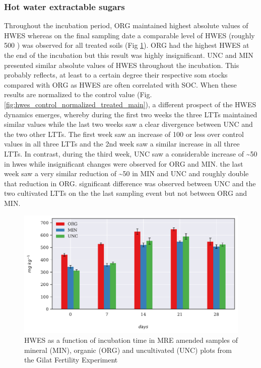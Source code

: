 		\subsubsection{Hot water extractable sugars}
			Throughout the incubation period, ORG maintained highest absolute values of HWES whereas on the final sampling date a comparable level of HWES (roughly 500 \genericunit) was observed for all treated soils (Fig \ref{fig:hwes_treated_main}). ORG  had the highest HWES at the end of the incubation but this result was highly insignificant. UNC and MIN presented similar absolute values of HWES throughout the incubation. This probably reflects, at least to a certain degree their respective \gls{som} stocks compared with ORG as HWES are often correlated with SOC.
			When these results are normalized to the control value (Fig. \ref{fig:hwes_control_normalized_treated_main}), a different prospect of the HWES dynamics emerges, whereby during the first two weeks the three LTTs maintained similar values while the last two weeks saw a clear divergence between UNC and the two other LTTs. The first week saw an increase of 100 \genericunit or less over control values in all three LTTs and the 2nd week saw a similar increase in all three LTTs. In contrast, during the third week, UNC saw a considerable increase of \~{}50 \genericunit in \gls{hwes} while insignificant changes were observed for ORG and MIN. the last week saw a very similar reduction of \~{}50 \genericunit in MIN and UNC and roughly double that reduction in ORG. significant difference was observed between UNC and the two cultivated LTTs on the the last sampling event but not between ORG and MIN.

			\begin{figure}[H]
				\centering
				\includegraphics[scale=0.8, width=\linewidth]{thesis_figures/main_incubation/MRE_treated/HWES.pdf}
				\caption{ \footnotesize	HWES as a function of incubation time in MRE amended samples of mineral (MIN), organic (ORG) and uncultivated (UNC) plots from the Gilat Fertility Experiment}
				\label{fig:hwes_treated_main}
			\end{figure}

